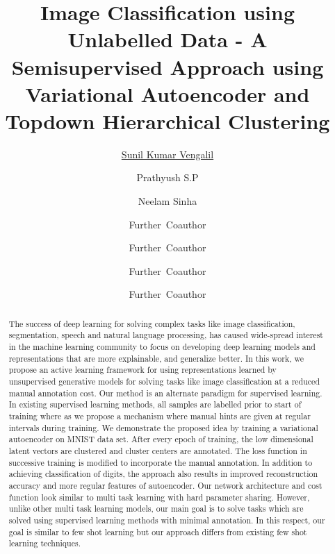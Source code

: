 \documentclass{uai2021} %
\title{Image Classification using Unlabelled Data - A Semisupervised Approach using Variational Autoencoder and Topdown Hierarchical Clustering}
\author[1]{\href{mailto:Sunil Kumar Vengalil <sunilkumar.vengalil@iiitb.org> ?Subject=Your UAI 2021 paper}{Sunil Kumar Vengalil}{}}
\author[2]{Prathyush S.P}
\author[1,2]{Neelam Sinha}
\author[3]{Further~Coauthor}
\author[1]{Further~Coauthor}
\author[3]{Further~Coauthor}
\author[3,1]{Further~Coauthor}
\affil[1]{%
    Computer Science Dept.\\
    Cranberry University\\
    Pittsburgh, Pennsylvania, USA
}
\affil[2]{%
    Affiliation\\
    Address\\
    …
}
\affil[3]{…}
\begin{document}
\maketitle

\begin{abstract}
The success of deep learning for solving complex tasks like image classification, segmentation, speech and natural language processing, has caused wide-spread interest in the machine learning community to focus on developing deep learning models and representations that are more explainable, and generalize better.
In this work, we propose an active learning framework for using representations learned by unsupervised generative models for solving tasks like image classification at a reduced manual annotation cost.
Our method is an alternate paradigm for supervised learning.
In existing supervised learning methods,  all samples are labelled prior to start of training where as we propose a mechanism where manual hints are given at regular intervals during training.
We demonstrate the proposed idea by training a  variational autoencoder on MNIST data set.
After every epoch of training, the low dimensional latent vectors are clustered and cluster centers are annotated.
The loss function in successive training is modified to incorporate the manual annotation.
In addition to achieving classification of digits, the approach also results in improved reconstruction accuracy and more regular features of autoencoder.
Our network architecture and cost function look similar to multi task learning with hard parameter sharing.
However, unlike other multi task learning models, our main goal is to solve tasks which are solved using supervised learning methods with minimal annotation.
In this respect, our goal is similar to few shot learning but our approach differs from existing few shot learning techniques.
\end{abstract}
\end{document}
